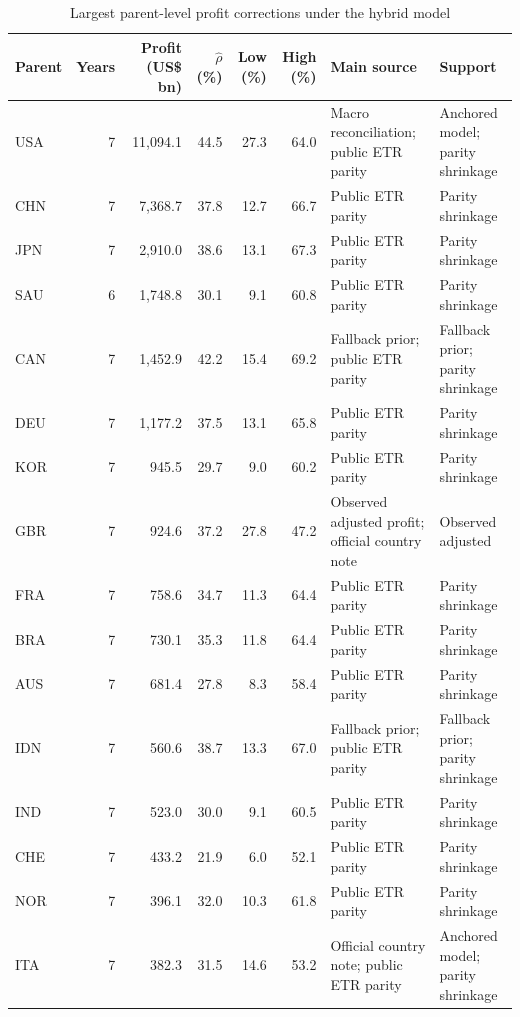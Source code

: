 \begin{table}[H]
\centering
\footnotesize
\setlength{\tabcolsep}{3pt}
\caption{Largest parent-level profit corrections under the hybrid model}
\label{tab:profit_correction_parent_year_top20}
\begin{adjustbox}{max width=\textwidth,center}
\begin{tabular}{@{}lrrrrrL{3.0cm}L{2.7cm}@{}}
\toprule
Parent & Years & Profit (US\$ bn) & $\hat{\rho}$ (\%) & Low (\%) & High (\%) & Main source & Support \\
\midrule
USA & 7 & 11,094.1 & 44.5 & 27.3 & 64.0 & Macro reconciliation; public ETR parity & Anchored model; parity shrinkage \\
CHN & 7 &  7,368.7 & 37.8 & 12.7 & 66.7 & Public ETR parity & Parity shrinkage \\
JPN & 7 &  2,910.0 & 38.6 & 13.1 & 67.3 & Public ETR parity & Parity shrinkage \\
SAU & 6 &  1,748.8 & 30.1 &  9.1 & 60.8 & Public ETR parity & Parity shrinkage \\
CAN & 7 &  1,452.9 & 42.2 & 15.4 & 69.2 & Fallback prior; public ETR parity & Fallback prior; parity shrinkage \\
DEU & 7 &  1,177.2 & 37.5 & 13.1 & 65.8 & Public ETR parity & Parity shrinkage \\
KOR & 7 &    945.5 & 29.7 &  9.0 & 60.2 & Public ETR parity & Parity shrinkage \\
GBR & 7 &    924.6 & 37.2 & 27.8 & 47.2 & Observed adjusted profit; official country note & Observed adjusted \\
FRA & 7 &    758.6 & 34.7 & 11.3 & 64.4 & Public ETR parity & Parity shrinkage \\
BRA & 7 &    730.1 & 35.3 & 11.8 & 64.4 & Public ETR parity & Parity shrinkage \\
AUS & 7 &    681.4 & 27.8 &  8.3 & 58.4 & Public ETR parity & Parity shrinkage \\
IDN & 7 &    560.6 & 38.7 & 13.3 & 67.0 & Fallback prior; public ETR parity & Fallback prior; parity shrinkage \\
IND & 7 &    523.0 & 30.0 &  9.1 & 60.5 & Public ETR parity & Parity shrinkage \\
CHE & 7 &    433.2 & 21.9 &  6.0 & 52.1 & Public ETR parity & Parity shrinkage \\
NOR & 7 &    396.1 & 32.0 & 10.3 & 61.8 & Public ETR parity & Parity shrinkage \\
ITA & 7 &    382.3 & 31.5 & 14.6 & 53.2 & Official country note; public ETR parity & Anchored model; parity shrinkage \\

\end{tabular}
\end{adjustbox}
\end{table}
